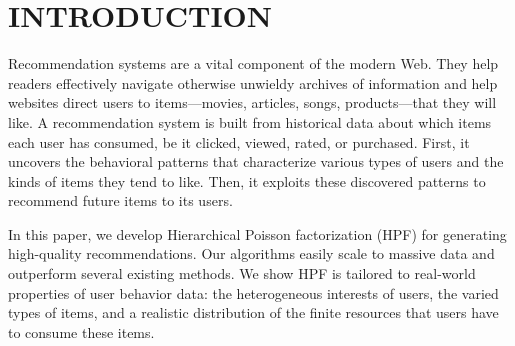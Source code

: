 \section{INTRODUCTION}
Recommendation systems are a vital component of the modern Web.  They
help readers effectively navigate otherwise unwieldy archives of
information and help websites direct users to items---movies,
articles, songs, products---that they will like.  A recommendation
system is built from historical data about which items each user has
consumed, be it clicked, viewed, rated, or purchased. First, it
uncovers the behavioral patterns that characterize various types of
users and the kinds of items they tend to like.  Then, it exploits
these discovered patterns to recommend future items to its users.

In this paper, we develop Hierarchical Poisson factorization (HPF) for
generating high-quality recommendations. Our algorithms easily scale
to massive data and outperform several existing methods. We show HPF
is tailored to real-world properties of user behavior data: the
heterogeneous interests of users, the varied types of items, and a
realistic distribution of the finite resources that users have to
consume these items.


